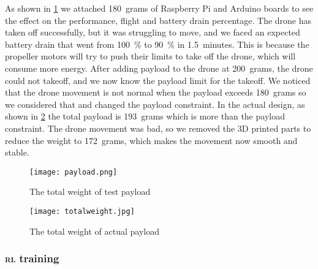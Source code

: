 \documentclass[../main.tex]{subfiles}
\begin{document}
As shown in \cref{fig:payload}
we attached \SI{180}{grams} of Raspberry Pi and Arduino boards
to see the effect on the performance, flight and
battery drain percentage. 
The drone has taken off successfully, 
but it was struggling to move, and we faced an expected 
battery drain that went from 
\SI{100}{\percent} to \SI{90}{\percent} in 
\SI{1.5}{minutes}. This is because the propeller motors will try to push 
their limits to take off the drone, which will consume more energy.
After adding payload to the drone at \SI{200}{grams}, the drone could not
takeoff, and we now know the payload limit for the takeoff. 
We noticed that the drone movement
is not normal when the payload exceeds \SI{180}{grams} 
so we considered that and changed
the payload constraint. In the actual design, as shown in 
\cref{fig:actual-total-weight} the total payload 
is \SI{193}{grams} which is more than the payload constraint. 
The drone movement was bad, so we removed the 3D printed
parts to reduce the weight to \SI{172}{grams}, 
which makes the movement now smooth and stable.

\begin{figure}[btp]
	\centering
	\texttt{[image: payload.png]}
	\caption{The total weight of test payload}
	\label{fig:payload}
\end{figure} 

\begin{figure}[tbp]
	\centering
	\texttt{[image: totalweight.jpg]}
	\caption{The total weight of actual payload}
	\label{fig:actual-total-weight}
\end{figure} 

\subsubsection{\textsc{rl} training}
\end{document}
